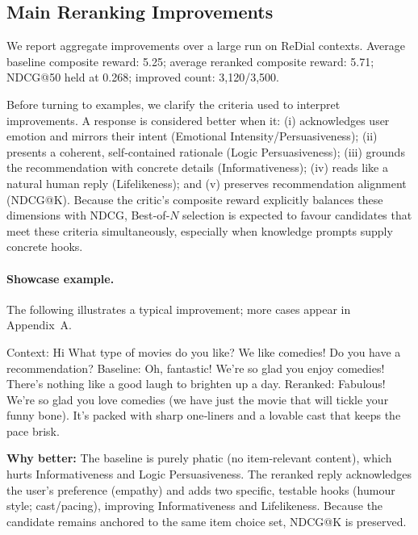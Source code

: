 \documentclass[12pt]{article}
\begin{document}
  \subsection{Main Reranking Improvements}
  We report aggregate improvements over a large run on ReDial contexts. Average baseline composite reward: 5.25; average reranked composite reward: 5.71; NDCG@50 held at 0.268; improved count: 3{,}120/3{,}500.
  
  Before turning to examples, we clarify the criteria used to interpret improvements. A response is considered better when it: (i) acknowledges user emotion and mirrors their intent (Emotional Intensity/Persuasiveness); (ii) presents a coherent, self‑contained rationale (Logic Persuasiveness); (iii) grounds the recommendation with concrete details (Informativeness); (iv) reads like a natural human reply (Lifelikeness); and (v) preserves recommendation alignment (NDCG@K). Because the critic's composite reward explicitly balances these dimensions with NDCG, Best‑of‑$N$ selection is expected to favour candidates that meet these criteria simultaneously, especially when knowledge prompts supply concrete hooks.
  
  \paragraph{Showcase example.} The following illustrates a typical improvement; more cases appear in Appendix~A.
  \begin{center}
  \begin{qexample}
  Context: Hi What type of movies do you like? We like comedies! Do you have a recommendation?
  Baseline: Oh, fantastic! We're so glad you enjoy comedies! There's nothing like a good laugh to brighten up a day.
  Reranked: Fabulous! We're so glad you love comedies (we have just the movie that will tickle your funny bone). It's packed with sharp one‑liners and a lovable cast that keeps the pace brisk.
  \end{qexample}
  \end{center}
  \textbf{Why better:} The baseline is purely phatic (no item‑relevant content), which hurts Informativeness and Logic Persuasiveness. The reranked reply acknowledges the user's preference (empathy) and adds two specific, testable hooks (humour style; cast/pacing), improving Informativeness and Lifelikeness. Because the candidate remains anchored to the same item choice set, NDCG@K is preserved.
  
\end{document}
